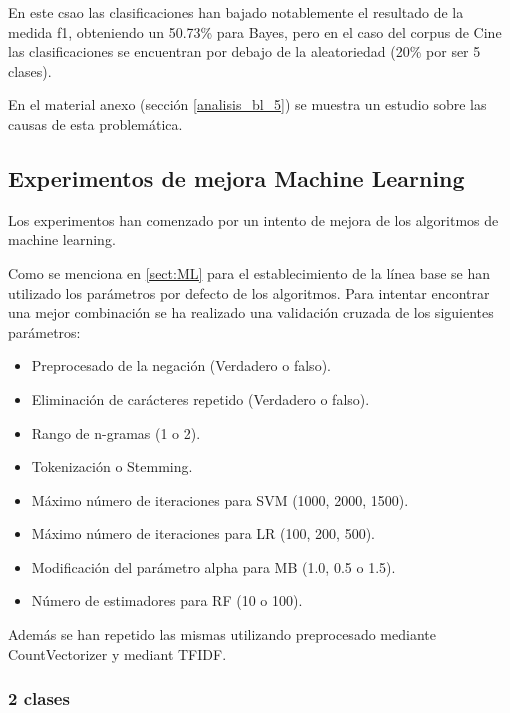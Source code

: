 En este csao las clasificaciones han bajado notablemente el resultado de la medida f1, obteniendo un 50.73\% para Bayes, pero en el caso del corpus de Cine las clasificaciones se encuentran por debajo de la aleatoriedad (20\% por ser 5 clases).

En el material anexo (sección \ref{analisis_bl_5}) se muestra un estudio sobre las causas de esta problemática.

\subsection{Experimentos de mejora Machine Learning}

Los experimentos han comenzado por un intento de mejora de los algoritmos de machine learning.

Como se menciona en \ref{sect:ML} para el establecimiento de la línea base se han utilizado los parámetros por defecto de los algoritmos. Para intentar encontrar una mejor combinación se ha realizado una validación cruzada de los siguientes parámetros:

\begin{itemize}
	\item Preprocesado de la negación (Verdadero o falso).
	\item Eliminación de carácteres repetido (Verdadero o falso).
	\item Rango de n-gramas (1 o 2).
	\item Tokenización o Stemming.
	\item Máximo número de iteraciones para SVM (1000, 2000, 1500).
	\item Máximo número de iteraciones para LR (100, 200, 500).
	\item Modificación del parámetro alpha para MB (1.0, 0.5 o 1.5).
	\item Número de estimadores para RF (10 o 100).
\end{itemize}

Además se han repetido las mismas utilizando preprocesado mediante CountVectorizer y mediant TFIDF.



\subsubsection{2 clases}

